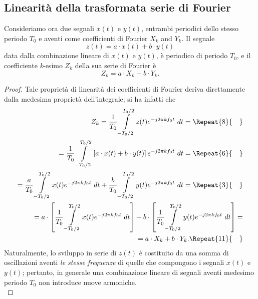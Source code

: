 \documentclass[12pt,oneside,openany]{memoir}
\numberwithin{equation}{subsection}
\newcommand{\quads}[1]{\Repeat{#1}{\quad}}
\newcommand{\dt}{\ dt}
\begin{document}
\newpage
\subsection{Linearit\`a della trasformata serie di Fourier}
Consideriamo ora due segnali $x(t)$ e $y(t)$, entrambi periodici dello stesso periodo $T_0$ e aventi come coefficienti di Fourier $X_k$ and $Y_k$. Il segnale
\begin{equation}
	z(t) = a \cdot x(t) + b \cdot y(t)
\end{equation}
data dalla combinazione lineare di $x(t)$ e $y(t)$, \`e periodico di periodo $T_0$, e il coefficiente \textit{k}-esimo $Z_k$ della sua serie di Fourier \`e
\begin{equation}
	Z_k = a \cdot X_k + b \cdot Y_k.
\end{equation}
\begin{proof}
Tale propriet\`a di linearit\`a dei coefficienti di Fourier deriva direttamente dalla medesima propriet\`a dell'integrale; si ha infatti che
\begin{equation}
\begin{split}
	Z_k = \frac{1}{T_0} \int\displaylimits_{-T_0/2}^{T_0/2} z(t) e^{-j 2 \pi k f_0 t} \dt =
	\quads{8}
	\\
	= \frac{1}{T_0} \int\displaylimits_{-T_0/2}^{T_0/2} \left[a \cdot x(t) + b \cdot y(t)\right] e^{-j 2 \pi k f_0 t} \dt =
	\quads{6}
	\\
	= \frac{a}{T_0} \int\displaylimits_{-T_0/2}^{T_0/2} x(t) e^{-j 2 \pi k f_0 t} \dt + \frac{b}{T_0} \int\displaylimits_{-T_0/2}^{T_0/2} y(t) e^{-j 2 \pi k f_0 t} \dt =
	\quads{3}
	\\
	= a \cdot \left[\frac{1}{T_0} \int\displaylimits_{-T_0/2}^{T_0/2} x(t) e^{-j 2 \pi k f_0 t} \dt \right] + b \cdot \left[\frac{1}{T_0} \int\displaylimits_{-T_0/2}^{T_0/2} y(t) e^{-j 2 \pi k f_0 t} \dt \right] =
	\\
	= a \cdot X_k + b \cdot Y_k.
	\quads{11}
\end{split}
\end{equation}
Naturalmente, lo sviluppo in serie di $z(t)$ \`e costituito da una somma di oscillazioni aventi \textit{le stesse frequenze} di quelle che compongono i segnali $x(t)$ e $y(t)$; pertanto, in generale una combinazione lineare di segnali aventi medesimo periodo $T_0$ non introduce nuove armoniche.\\
\end{proof}

\newpage
\end{document}

